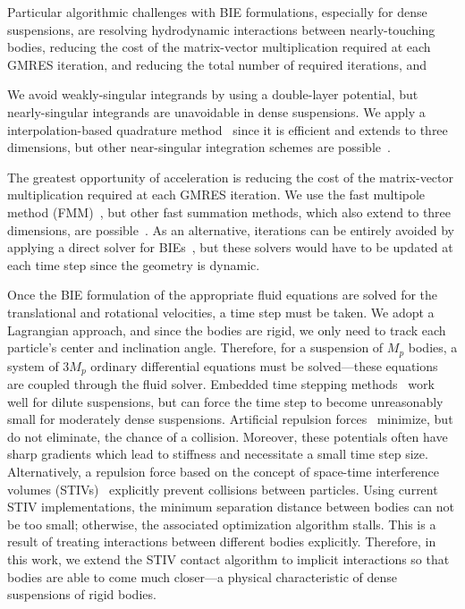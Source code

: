 \documentclass[preprint, 10pt]{elsarticle}
\begin{document}
Particular algorithmic challenges with BIE formulations, especially for
dense suspensions, are resolving hydrodynamic interactions between
nearly-touching bodies, reducing the cost of the matrix-vector
multiplication required at each GMRES iteration, and reducing the total
number of required iterations, and 

We avoid weakly-singular integrands by using a double-layer potential,
but nearly-singular integrands are unavoidable in dense suspensions.  We
apply a interpolation-based quadrature method~\cite{Ying2006,
Quaife2014} since it is efficient and extends to three dimensions, but
other near-singular integration schemes are possible~\cite{Klockner2013,
Barnett2015, Beale2016, Helsing2008, Kropinski1999, Mammoli2006}.  

The greatest opportunity of acceleration is reducing the cost of the
matrix-vector multiplication required at each GMRES iteration.  We use
the fast multipole method (FMM)~\cite{Greengard1987, gre-gre-may1992},
but other fast summation methods, which also extend to three dimensions,
are possible~\cite{bar-hut1986, kli-tor2014}.  As an alternative,
iterations can be entirely avoided by applying a direct solver for
BIEs~\cite{mar-bar-gil-vee2016}, but these solvers would have to be
updated at each time step since the geometry is dynamic.

Once the BIE formulation of the appropriate fluid equations are solved
for the translational and rotational velocities, a time step must be
taken.  We adopt a Lagrangian approach, and since the bodies are rigid,
we only need to track each particle's center and inclination angle.
Therefore, for a suspension of $M_p$ bodies, a system of $3M_p$ ordinary
differential equations must be solved---these equations are coupled
through the fluid solver.  Embedded time stepping
methods~\cite{kli-tor2014} work well for dilute suspensions, but can
force the time step to become unreasonably small for moderately dense
suspensions. Artificial repulsion forces~\cite{Flormann2017, Liu2006,
Malhotra2018, Lu2017, Kabacogulu2017} minimize, but do not eliminate,
the chance of a collision. Moreover, these potentials often have sharp
gradients which lead to stiffness and necessitate a small time step
size. Alternatively, a repulsion force based on the concept of
space-time interference volumes (STIVs)~\cite{Harmon2011, Lu2017}
explicitly prevent collisions between particles.  Using current STIV
implementations, the minimum separation distance between bodies can not
be too small; otherwise, the associated optimization algorithm stalls.
This is a result of treating interactions between different bodies
explicitly.  Therefore, in this work, we extend the STIV contact
algorithm to implicit interactions so that bodies are able to come much
closer---a physical characteristic of dense suspensions of rigid bodies.
\end{document}

